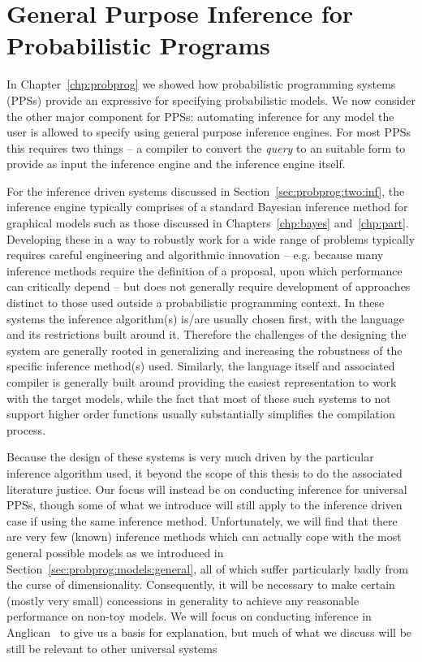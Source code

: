 
\chapter{General Purpose Inference for Probabilistic Programs}
\label{chp:proginf}

In Chapter~\ref{chp:probprog} we showed how probabilistic programming systems (PPSs) provide
an expressive for specifying probabilistic models.  We now consider the other major component
for PPSs: automating inference for any model the user is allowed to specify using general purpose
inference engines.  For most PPSs this requires two things --  a compiler to convert the \emph{query} to an
suitable form to provide as input the inference engine and the inference engine itself.  

For the inference
driven systems discussed in Section~\ref{sec:probprog:two:inf}, the inference engine typically comprises of
a standard Bayesian inference method for graphical models such as those discussed in Chapters~\ref{chp:bayes}
and~\ref{chp:part}.  Developing these in a way to robustly work for a wide range of problems typically
requires careful engineering and algorithmic innovation -- e.g. because many inference methods require the definition of
a proposal, upon which performance can critically depend -- but does not generally require development 
of approaches distinct to those used outside a probabilistic programming context.  In these 
systems the inference algorithm(s) is/are usually chosen first, with the language and its restrictions built around it.
Therefore the challenges of the designing the system are generally rooted in generalizing and increasing the robustness of the 
specific inference method(s) used.  Similarly, the language itself and associated compiler is generally built
around providing the easiest representation to work with the target models, while the fact that most of
these such systems to not support higher order functions usually substantially simplifies the compilation
process.

Because the design of these systems is very much driven by the particular inference algorithm used, it
beyond the scope of this thesis to do the associated literature justice.  Our focus will instead be on 
conducting inference for universal PPSs, though some of what we introduce will still apply to the inference
driven case if using the same inference method.
Unfortunately, we will find that there are very few (known) inference
methods which can actually cope with the most general possible models as we introduced in
Section~\ref{sec:probprog:models:general}, all of which suffer particularly badly from the curse of
dimensionality.  Consequently, it will be necessary to make certain (mostly very small) concessions in 
generality to achieve any reasonable performance on non-toy models.  We will focus on conducting
inference in Anglican~\citep{wood2014new} to give us a basis for explanation, but much of
what we discuss will be still be relevant to other universal systems

